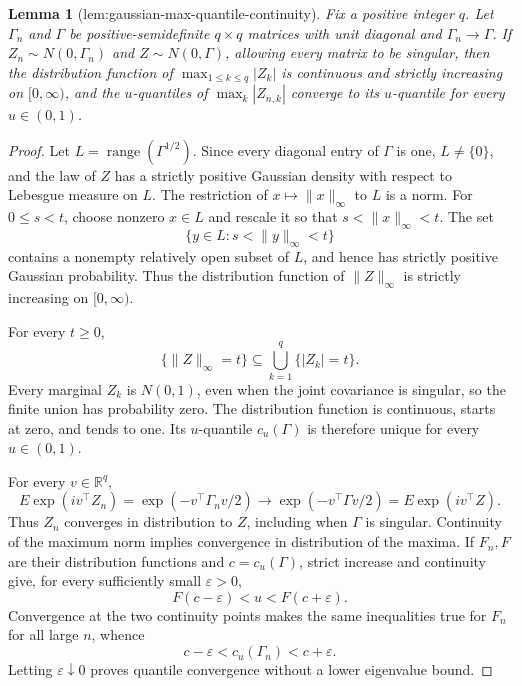 \documentclass{article}
\newtheorem{lemma}{Lemma}
\begin{document}
\begin{lemma}[lem:gaussian-max-quantile-continuity]\label{lem:gaussian-max-quantile-continuity}
Fix a positive integer \(q\).  Let \(\Gamma_n\) and \(\Gamma\) be positive-semidefinite \(q\times q\) matrices with unit diagonal and \(\Gamma_n\to\Gamma\).  If \(Z_n\sim N(0,\Gamma_n)\) and \(Z\sim N(0,\Gamma)\), allowing every matrix to be singular, then the distribution function of \(\max_{1\leq k\leq q}|Z_k|\) is continuous and strictly increasing on \([0,\infty)\), and the \(u\)-quantiles of \(\max_k|Z_{n,k}|\) converge to its \(u\)-quantile for every \(u\in(0,1)\).
\end{lemma}
\begin{proof}
Let \(L=\operatorname{range}(\Gamma^{1/2})\).  Since every diagonal entry of \(\Gamma\) is one, \(L\neq\{0\}\), and the law of \(Z\) has a strictly positive Gaussian density with respect to Lebesgue measure on \(L\).  The restriction of \(x\mapsto\|x\|_\infty\) to \(L\) is a norm.  For \(0\leq s<t\), choose nonzero \(x\in L\) and rescale it so that \(s<\|x\|_\infty<t\).  The set
\[
 \{y\in L:s<\|y\|_\infty<t\}
\]
contains a nonempty relatively open subset of \(L\), and hence has strictly positive Gaussian probability.  Thus the distribution function of \(\|Z\|_\infty\) is strictly increasing on \([0,\infty)\).

For every \(t\geq0\),
\[
 \{\|Z\|_\infty=t\}\subseteq\bigcup_{k=1}^q\{|Z_k|=t\}.
\]
Every marginal \(Z_k\) is \(N(0,1)\), even when the joint covariance is singular, so the finite union has probability zero.  The distribution function is continuous, starts at zero, and tends to one.  Its \(u\)-quantile \(c_u(\Gamma)\) is therefore unique for every \(u\in(0,1)\).

For every \(v\in\mathbb R^q\),
\[
 E\exp(i v^\top Z_n)=\exp(-v^\top\Gamma_nv/2)
 \longrightarrow\exp(-v^\top\Gamma v/2)=E\exp(i v^\top Z).
\]
Thus \(Z_n\) converges in distribution to \(Z\), including when \(\Gamma\) is singular.  Continuity of the maximum norm implies convergence in distribution of the maxima.  If \(F_n,F\) are their distribution functions and \(c=c_u(\Gamma)\), strict increase and continuity give, for every sufficiently small \(\varepsilon>0\),
\[
 F(c-\varepsilon)<u<F(c+\varepsilon).
\]
Convergence at the two continuity points makes the same inequalities true for \(F_n\) for all large \(n\), whence
\[
 c-\varepsilon<c_u(\Gamma_n)<c+\varepsilon.
\]
Letting \(\varepsilon\downarrow0\) proves quantile convergence without a lower eigenvalue bound.
\end{proof}
\end{document}
